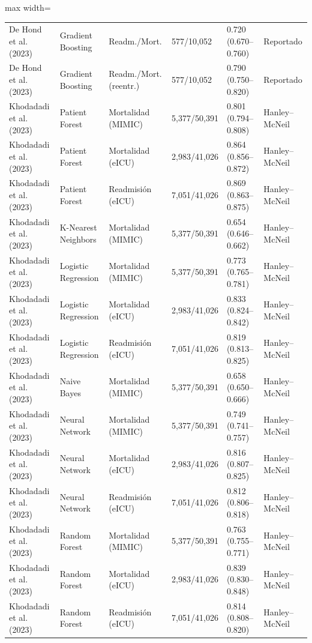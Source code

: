 \begin{table}[H]
\begin{adjustbox}{max width=\textwidth}
\begin{tabular}{llllll}
    De Hond et al. (2023) & Gradient Boosting & Readm./Mort. & 577/10,052 & 0.720 (0.670--0.760) & Reportado \\
    De Hond et al. (2023) & Gradient Boosting & Readm./Mort. (reentr.) & 577/10,052 & 0.790 (0.750--0.820) & Reportado \\
    Khodadadi et al. (2023) & Patient Forest & Mortalidad (MIMIC) & 5,377/50,391 & 0.801 (0.794--0.808) & Hanley--McNeil \\
    Khodadadi et al. (2023) & Patient Forest & Mortalidad (eICU) & 2,983/41,026 & 0.864 (0.856--0.872) & Hanley--McNeil \\
    Khodadadi et al. (2023) & Patient Forest & Readmisión (eICU) & 7,051/41,026 & 0.869 (0.863--0.875) & Hanley--McNeil \\
    Khodadadi et al. (2023) & K-Nearest Neighbors & Mortalidad (MIMIC) & 5,377/50,391 & 0.654 (0.646--0.662) & Hanley--McNeil \\
    Khodadadi et al. (2023) & Logistic Regression & Mortalidad (MIMIC) & 5,377/50,391 & 0.773 (0.765--0.781) & Hanley--McNeil \\
    Khodadadi et al. (2023) & Logistic Regression & Mortalidad (eICU) & 2,983/41,026 & 0.833 (0.824--0.842) & Hanley--McNeil \\
    Khodadadi et al. (2023) & Logistic Regression & Readmisión (eICU) & 7,051/41,026 & 0.819 (0.813--0.825) & Hanley--McNeil \\
    Khodadadi et al. (2023) & Naive Bayes & Mortalidad (MIMIC) & 5,377/50,391 & 0.658 (0.650--0.666) & Hanley--McNeil \\
    Khodadadi et al. (2023) & Neural Network & Mortalidad (MIMIC) & 5,377/50,391 & 0.749 (0.741--0.757) & Hanley--McNeil \\
    Khodadadi et al. (2023) & Neural Network & Mortalidad (eICU) & 2,983/41,026 & 0.816 (0.807--0.825) & Hanley--McNeil \\
    Khodadadi et al. (2023) & Neural Network & Readmisión (eICU) & 7,051/41,026 & 0.812 (0.806--0.818) & Hanley--McNeil \\
    Khodadadi et al. (2023) & Random Forest & Mortalidad (MIMIC) & 5,377/50,391 & 0.763 (0.755--0.771) & Hanley--McNeil \\
    Khodadadi et al. (2023) & Random Forest & Mortalidad (eICU) & 2,983/41,026 & 0.839 (0.830--0.848) & Hanley--McNeil \\
    Khodadadi et al. (2023) & Random Forest & Readmisión (eICU) & 7,051/41,026 & 0.814 (0.808--0.820) & Hanley--McNeil \\

\end{tabular}
\end{adjustbox}
\end{table}
